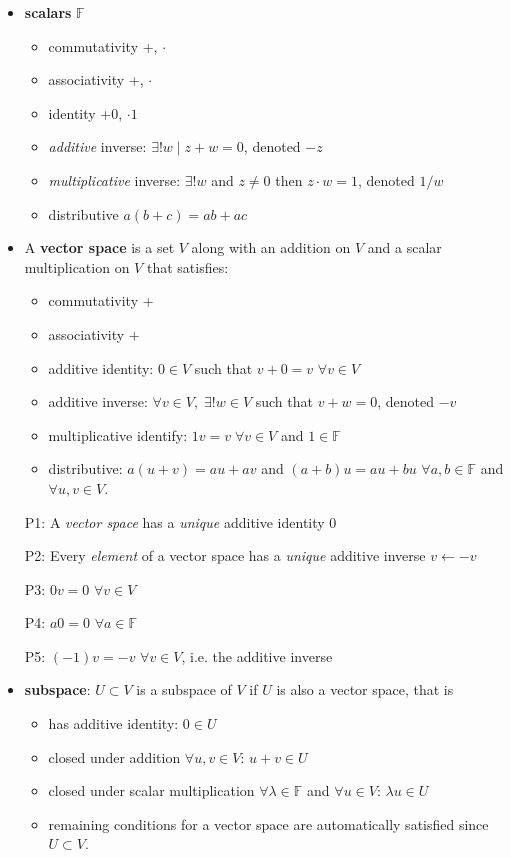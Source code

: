 \documentclass[11pt,notitlepage,oneside]{article}
\begin{document}
\begin{itemize}
\item \textbf{scalars} $\mathbb{F}$
\begin{itemize}
\item commutativity +, $\cdot$
\item associativity +, $\cdot$
\item identity +0, $\cdot 1$
\item \emph{additive} inverse: $\exists!w \mid z + w = 0$, denoted $-z$
\item \emph{multiplicative} inverse: $\exists!w$ and $z\neq0$ then $z\cdot w = 1$, denoted $1/w$
\item distributive $a(b+c) = ab+ac$
\end{itemize}
\item A \textbf{vector space} is a set $V$ along with an addition on $V$ and a scalar multiplication on $V$ that satisfies:
\begin{itemize}
\item commutativity +
\item associativity +
\item additive identity: $0\in V$ such that $v+0=v$ $\forall v\in V$
\item additive inverse: $\forall v\in V,\; \exists!w\in V$ such that $v+w=0$, denoted $-v$
\item multiplicative identify: $1v=v\;\forall v\in V$ and $1\in\mathbb{F}$
\item distributive: $a(u+v)=au+av$ and $(a+b)u=au+bu$ $\forall a,b\in\mathbb{F}$ and $\forall u,v \in V$.
\end{itemize}
 
\item[P1:\label{it:P1_1}] A \emph{vector space} has a \emph{unique} additive identity $0$
\item[P2:\label{it:P1_2}] Every \emph{element} of a vector space has a \emph{unique} additive inverse $v\leftarrow -v$
\item[P3:] $0v=0$ $\forall v\in V$
\item[P4:] $a0=0$ $\forall a\in \mathbb{F}$
\item[P5:] $(-1)v = -v$ $\forall v\in V$, i.e. the additive inverse

\item \textbf{subspace}: $U\subset V$ is a subspace of $V$ if $U$ is also a vector space, that is
\begin{itemize}
\item has additive identity: $0\in U$
\item closed under addition $\forall u,v \in V$: $u+v \in U$ 
\item closed under scalar multiplication $\forall \lambda\in \mathbb{F}$ and $\forall u \in V$: $\lambda u \in U$  
\item remaining conditions for a vector space are automatically satisfied since $U\subset V$.
\end{itemize} 


\end{itemize}
\end{document}
